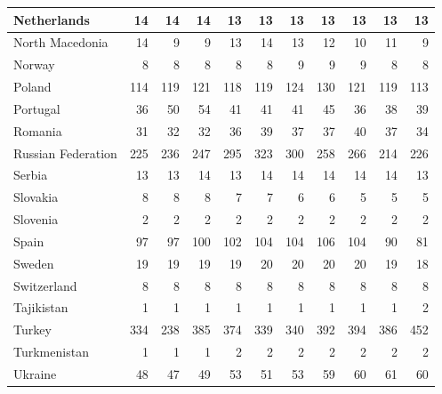 \begin{table}
\begin{tabular}{|l|r|r|r|r|r|r|r|r|r|r|}
                   Netherlands&     14&     14&     14&     13&     13&     13&     13&     13&     13&     13\\\hline
               North Macedonia&     14&      9&      9&     13&     14&     13&     12&     10&     11&      9\\\hline
                        Norway&      8&      8&      8&      8&      8&      9&      9&      9&      8&      8\\\hline
                        Poland&    114&    119&    121&    118&    119&    124&    130&    121&    119&    113\\\hline
                      Portugal&     36&     50&     54&     41&     41&     41&     45&     36&     38&     39\\\hline
                       Romania&     31&     32&     32&     36&     39&     37&     37&     40&     37&     34\\\hline
            Russian Federation&    225&    236&    247&    295&    323&    300&    258&    266&    214&    226\\\hline
                        Serbia&     13&     13&     14&     13&     14&     14&     14&     14&     14&     13\\\hline
                      Slovakia&      8&      8&      8&      7&      7&      6&      6&      5&      5&      5\\\hline
                      Slovenia&      2&      2&      2&      2&      2&      2&      2&      2&      2&      2\\\hline
                         Spain&     97&     97&    100&    102&    104&    104&    106&    104&     90&     81\\\hline
                        Sweden&     19&     19&     19&     19&     20&     20&     20&     20&     19&     18\\\hline
                   Switzerland&      8&      8&      8&      8&      8&      8&      8&      8&      8&      8\\\hline
                    Tajikistan&      1&      1&      1&      1&      1&      1&      1&      1&      1&      2\\\hline
                        Turkey&    334&    238&    385&    374&    339&    340&    392&    394&    386&    452\\\hline
                  Turkmenistan&      1&      1&      1&      2&      2&      2&      2&      2&      2&      2\\\hline
                       Ukraine&     48&     47&     49&     53&     51&     53&     59&     60&     61&     60\\\hline

\end{tabular}
\end{table}
